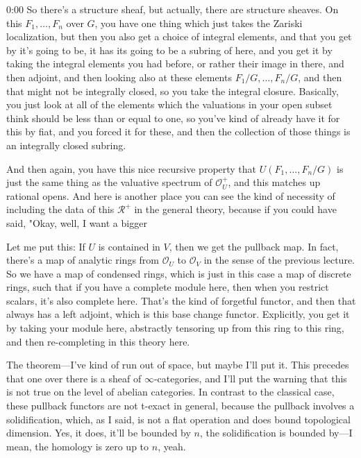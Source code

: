 \begin{unfinished}{0:00}
So there's a structure sheaf, but actually, there are structure sheaves. On this $F_1, \dots, F_n$ over $G$, you have one thing which just takes the Zariski localization, but then you also get a choice of integral elements, and that you get by it's going to be, it has its going to be a subring of here, and you get it by taking the integral elements you had before, or rather their image in there, and then adjoint, and then looking also at these elements $F_1/G, \dots, F_n/G$, and then that might not be integrally closed, so you take the integral closure. Basically, you just look at all of the elements which the valuations in your open subset think should be less than or equal to one, so you've kind of already have it for this by fiat, and you forced it for these, and then the collection of those things is an integrally closed subring. 

And then again, you have this nice recursive property that $U(F_1, \dots, F_n/G)$ is just the same thing as the valuative spectrum of $\mathcal{O}_U^+$, and this matches up rational opens. And here is another place you can see the kind of necessity of including the data of this $\mathcal{R}^+$ in the general theory, because if you could have said, "Okay, well, I want a bigger

Let me put this: If $U$ is contained in $V$, then we get the pullback map. In fact, there's a map of analytic rings from $\mathcal{O}_U$ to $\mathcal{O}_V$ in the sense of the previous lecture. So we have a map of condensed rings, which is just in this case a map of discrete rings, such that if you have a complete module here, then when you restrict scalars, it's also complete here. That's the kind of forgetful functor, and then that always has a left adjoint, which is this base change functor. Explicitly, you get it by taking your module here, abstractly tensoring up from this ring to this ring, and then re-completing in this theory here.

The theorem---I've kind of run out of space, but maybe I'll put it. This precedes that one over there is a sheaf of $\infty$-categories, and I'll put the warning that this is not true on the level of abelian categories. In contrast to the classical case, these pullback functors are not t-exact in general, because the pullback involves a solidification, which, as I said, is not a flat operation and does bound topological dimension. Yes, it does, it'll be bounded by $n$, the solidification is bounded by---I mean, the homology is zero up to $n$, yeah.


\end{unfinished}
